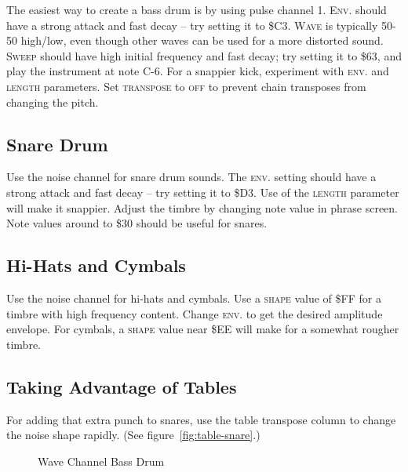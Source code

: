 The easiest way to create a bass drum is by using pulse channel 1. \textsc{Env.} should have a strong attack and fast decay -- try setting it to \$C3. \textsc{Wave} is typically 50-50 high/low, even though other waves can be used for a more distorted sound. \textsc{Sweep} should have high initial frequency and fast decay; try setting it to \$63, and play the instrument at note C-6. For a snappier kick, experiment with \textsc{env.} and \textsc{length} parameters. Set \textsc{transpose} to \textsc{off} to prevent chain transposes from changing the pitch.

\subsection{Snare Drum}

Use the noise channel for snare drum sounds. The \textsc{env.} setting should have a strong attack and fast decay -- try setting it to \$D3. Use of the \textsc{length} parameter will make it snappier. Adjust the timbre by changing note value in phrase screen. Note values around to \$30 should be useful for snares.

\subsection{Hi-Hats and Cymbals}

Use the noise channel for hi-hats and cymbals. Use a \textsc{shape} value of \$FF for a timbre with high frequency content. Change \textsc{env.} to get the desired amplitude envelope. For cymbals, a \textsc{shape} value near \$EE will make for a somewhat rougher timbre.

\subsection{Taking Advantage of Tables}

For adding that extra punch to snares, use the table transpose column to change the noise shape rapidly. (See figure~\ref{fig:table-snare}.)

\begin{figure}[hbtp]
	\centering
	\qquad

	\qquad

	\caption{Wave Channel Bass Drum}
	\label{fig:wavekick}
\end{figure}


